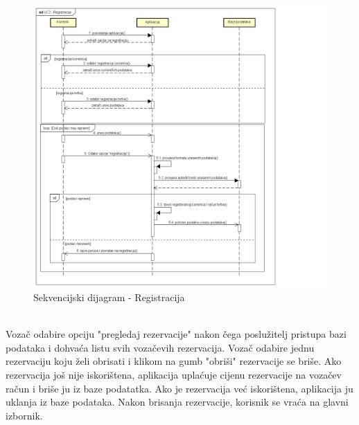				\begin{figure}[H]
					\includegraphics[scale=0.5]{dijagrami/Sekvencijski dijagram - Registracija.png} %
					\centering
					\caption{Sekvencijski dijagram - Registracija}
					\label{fig:promjene}
				\end{figure}	
			
				\newpage
				\\
				Vozač odabire opciju "pregledaj rezervacije" nakon čega poslužitelj pristupa bazi podataka i dohvaća listu svih vozačevih rezervacija. Vozač odabire jednu rezervaciju koju želi obrisati i klikom na gumb "obriši" rezervacije se briše. Ako rezervacija još nije iskorištena, aplikacija uplaćuje cijenu rezervacije na vozačev račun i briše ju iz baze podatatka. Ako je rezervacija već iskorištena, aplikacija ju uklanja iz baze podataka. Nakon brisanja rezervacije, korisnik se vraća na glavni izbornik.
			\\
				
